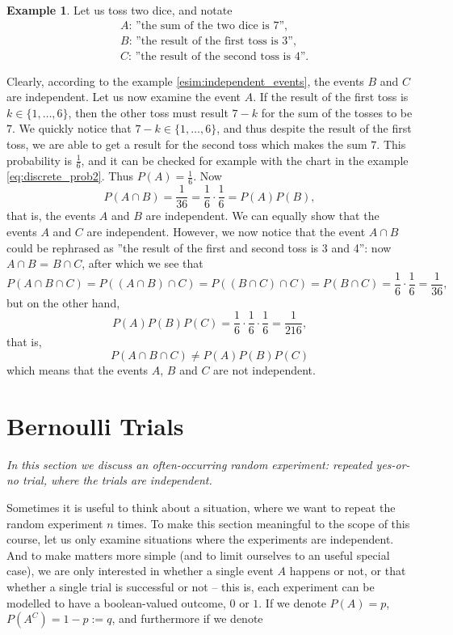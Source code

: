 \documentclass[12pt,a4paper,leqno]{report}
\theoremstyle{plain}
\theoremstyle{definition}
\newtheorem{esim}[equation]{Example}
\begin{document}
\begin{esim}
Let us toss two dice, and notate
\[
\begin{split}
&A \text{: ''the sum of the two dice is 7''}, \\
&B \text{: ''the result of the first toss is 3''}, \\
&C \text{: ''the result of the second toss is 4''}.
\end{split}
\]

Clearly, according to the example \ref{esim:independent_events}, the events $B$ and $C$ are independent. Let us now examine the event $A$. If the result of the first toss is  $k \in \{1, \ldots, 6\}$, then the other toss must result $7-k$ for the sum of the tosses to be $7.$ We quickly notice that $7-k \in \{1, \ldots, 6\}$, and thus despite the result of the first toss, we are able to get a result for the second toss which makes the sum $7.$ This probability is $\frac{1}{6}$, and it can be checked for example with the chart in the example \ref{eq:discrete_prob2}. Thus $P(A)=\frac{1}{6}$. Now
\[
P(A \cap B) = \frac{1}{36} = \frac{1}{6} \cdot \frac{1}{6} = P(A)P(B),
\]
that is, the events $A$ and $B$ are independent. We can equally show that the events $A$ and $C$ are independent. However, we now notice that the event $A \cap B$ could be rephrased as ''the result of the first and second toss is 3 and 4'': now $A \cap B$ = $B \cap C$, after which we see that
\[
P(A \cap B \cap C) = P((A \cap B) \cap C) = P((B \cap C) \cap C) = P(B \cap C) = \frac{1}{6} \cdot \frac{1}{6} = \frac{1}{36}, 
\]
but on the other hand,
\[
P(A)P(B)P(C) = \frac{1}{6} \cdot \frac{1}{6} \cdot \frac{1}{6} = \frac{1}{216},
\]
that is,
\[
P(A \cap B \cap C) \neq P(A)P(B)P(C)
\]
which means that the events $A$, $B$ and $C$ are not independent. 
\end{esim}

\section{Bernoulli Trials}\label{toistokokeet}

\emph{In this section we discuss an often-occurring random experiment: repeated yes-or-no trial, where the trials are independent.}

Sometimes it is useful to think about a situation, where we want to repeat the random experiment $n$ times. To make this section meaningful to the scope of this course, let us only examine situations where the experiments are independent. And to make matters more simple (and to limit ourselves to an useful special case), we are only interested in whether a single event $A$ happens or not, or that whether a single trial is successful or not -- this is, each experiment can be modelled to have a boolean-valued outcome, $0$ or $1$. If we denote $P(A)=p$, $P(A^C) = 1-p :=q $, and furthermore if we denote
\end{document}
